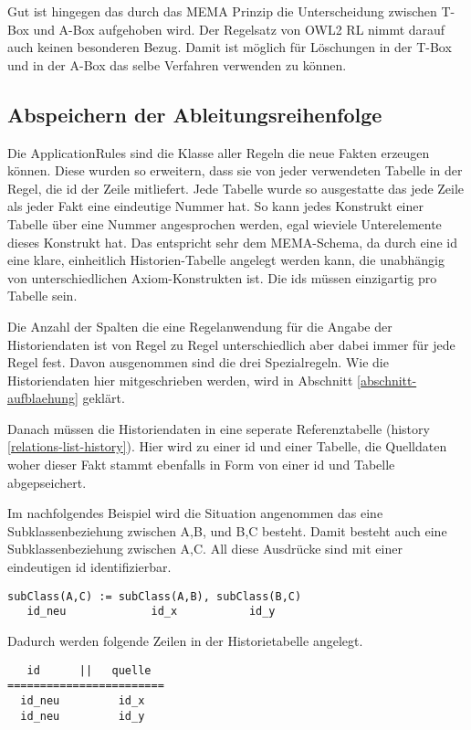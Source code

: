 Gut ist hingegen das durch das MEMA Prinzip die Unterscheidung zwischen T-Box und A-Box aufgehoben wird. Der Regelsatz von OWL2 RL nimmt darauf auch keinen besonderen Bezug. Damit ist möglich für Löschungen in der T-Box und in der A-Box das selbe Verfahren verwenden zu können.

\subsection{Abspeichern der Ableitungsreihenfolge}
Die ApplicationRules sind die Klasse aller Regeln die neue Fakten erzeugen können. Diese wurden so erweitern, dass sie von jeder verwendeten Tabelle in der Regel, die id der Zeile mitliefert. Jede Tabelle wurde so ausgestatte das jede Zeile als jeder Fakt eine eindeutige Nummer hat. So kann jedes Konstrukt einer Tabelle über eine Nummer angesprochen werden, egal wieviele Unterelemente dieses Konstrukt hat. Das entspricht sehr dem MEMA-Schema, da durch eine id eine klare, einheitlich Historien-Tabelle angelegt werden kann, die unabhängig von unterschiedlichen Axiom-Konstrukten ist. Die ids müssen einzigartig pro Tabelle sein.

Die Anzahl der Spalten die eine Regelanwendung für die Angabe der Historiendaten ist von Regel zu Regel unterschiedlich aber dabei immer für jede Regel fest. Davon ausgenommen sind die drei Spezialregeln. Wie die Historiendaten hier mitgeschrieben werden, wird in Abschnitt \ref{abschnitt-aufblaehung} geklärt.

Danach müssen die Historiendaten in eine seperate Referenztabelle (history \ref{relations-list-history}). Hier wird zu einer id und einer Tabelle, die Quelldaten woher dieser Fakt stammt ebenfalls in Form von einer id und Tabelle abgepseichert.

Im nachfolgendes Beispiel wird die Situation angenommen das eine Subklassenbeziehung zwischen A,B, und B,C besteht. Damit besteht auch eine Subklassenbeziehung zwischen A,C. All diese Ausdrücke sind mit einer eindeutigen id identifizierbar.
\begin{verbatim}
subClass(A,C) := subClass(A,B), subClass(B,C)
   id_neu             id_x           id_y
\end{verbatim}

Dadurch werden folgende Zeilen in der Historietabelle angelegt.
\begin{verbatim}
   id      ||   quelle
========================
  id_neu         id_x
  id_neu         id_y 
\end{verbatim}

